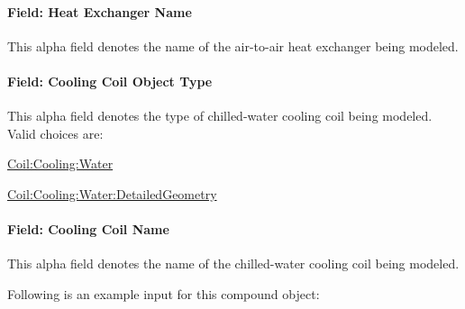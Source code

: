 \paragraph{Field: Heat Exchanger Name}\label{field-heat-exchanger-name-1}

This alpha field denotes the name of the air-to-air heat exchanger being modeled.

\paragraph{Field: Cooling Coil Object Type}\label{field-cooling-coil-object-type-2}

This alpha field denotes the type of chilled-water cooling coil being modeled. Valid choices are:

\hyperref[coilcoolingwater]{Coil:Cooling:Water}

\hyperref[coilcoolingwaterdetailedgeometry]{Coil:Cooling:Water:DetailedGeometry}

\paragraph{Field: Cooling Coil Name}\label{field-cooling-coil-name-2}

This alpha field denotes the name of the chilled-water cooling coil being modeled.

Following is an example input for this compound object:

